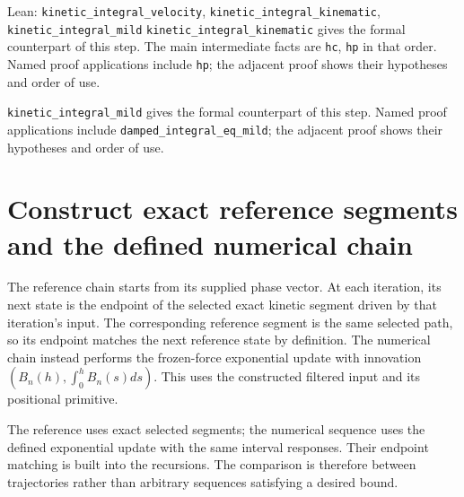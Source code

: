 \documentclass[11pt,a4paper]{article}
\begin{document}
\begin{leanbox}{Lean: \texttt{kinetic\_\allowbreak{}integral\_\allowbreak{}velocity}, \texttt{kinetic\_\allowbreak{}integral\_\allowbreak{}kinematic}, \texttt{kinetic\_\allowbreak{}integral\_\allowbreak{}mild}}
\texttt{kinetic\_\allowbreak{}integral\_\allowbreak{}kinematic} gives the formal counterpart of this step. The main intermediate facts are \texttt{hc}, \texttt{hp} in that order. Named proof applications include \texttt{hp}; the adjacent proof shows their hypotheses and order of use.




\texttt{kinetic\_\allowbreak{}integral\_\allowbreak{}mild} gives the formal counterpart of this step. Named proof applications include \texttt{damped\_\allowbreak{}integral\_\allowbreak{}eq\_\allowbreak{}mild}; the adjacent proof shows their hypotheses and order of use.
\end{leanbox}

\section{\texorpdfstring{Construct exact reference segments and the defined numerical chain}{Construct exact reference segments and the defined numerical chain}}


The reference chain starts from its supplied phase vector. At each iteration, its next state is the endpoint of the selected exact kinetic segment driven by that iteration's input. The corresponding reference segment is the same selected path, so its endpoint matches the next reference state by definition. The numerical chain instead performs the frozen-force exponential update with innovation \((B_n(h),\int_0^hB_n(s)ds)\). This uses the constructed filtered input and its positional primitive.



The reference uses exact selected segments; the numerical sequence uses the defined exponential update with the same interval responses. Their endpoint matching is built into the recursions. The comparison is therefore between trajectories rather than arbitrary sequences satisfying a desired bound.
\end{document}
